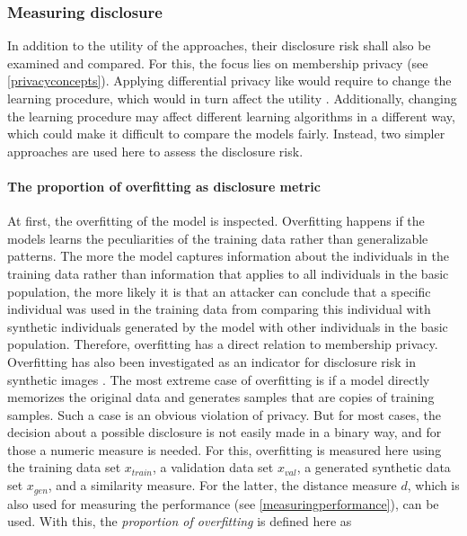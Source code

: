 \documentclass[12pt]{article}
\begin{document}
\subsubsection{Measuring disclosure}\label{measuringdisclosure}

In addition to the utility of the approaches, their disclosure risk shall also be examined and compared.
For this, the focus lies on membership privacy (see \ref{privacyconcepts}).
Applying differential privacy like \cite{abadi_deep_2016} would require to change the learning procedure, which would in turn affect the utility \citep{hayes_logan_2019}.
Additionally, changing the learning procedure may affect different learning algorithms in a different way, which could make it difficult to compare the models fairly.
Instead, two simpler approaches are used here to assess the disclosure risk.

\paragraph{The proportion of overfitting as disclosure metric}\label{proportionoverfitting}

At first, the overfitting of the model is inspected.
Overfitting happens if the models learns the peculiarities of the training data rather than generalizable patterns.
The more the model captures information about the individuals in the training data rather than information that applies to all individuals in the basic population, the more likely it is that an attacker can conclude that a specific individual was used in the training data from comparing this individual with synthetic individuals generated by the model with other individuals in the basic population.
Therefore, overfitting has a direct relation to membership privacy.
Overfitting has also been investigated as an indicator for disclosure risk in synthetic images \citep{webster_detecting_2019, hayes_logan_2019}.
The most extreme case of overfitting is if a model directly memorizes the original data and generates samples that are copies of training samples.
Such a case is an obvious violation of privacy.
But for most cases, the decision about a possible disclosure is not easily made in a binary way, and for those a numeric measure is needed.
For this, overfitting is measured here using the training data set $x_{train}$, a validation data set $x_{val}$, a generated synthetic data set $x_{gen}$, and a similarity measure.
For the latter, the distance measure $d$, which is also used for measuring the performance (see \ref{measuringperformance}), can be used.
With this, the {\em proportion of overfitting} is defined here as
\end{document}
